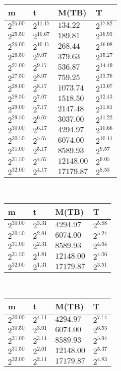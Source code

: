 \begin{tabular}{llll}
m & t & M(TB) & T \\ \hline
$2^{25.00}$ & $2^{11.17}$ & $134.22$ & $2^{17.82}$ \\
$2^{25.50}$ & $2^{10.67}$ & $189.81$ & $2^{16.93}$ \\
$2^{26.00}$ & $2^{10.17}$ & $268.44$ & $2^{16.08}$ \\
$2^{26.50}$ & $2^{9.67}$ & $379.63$ & $2^{15.27}$ \\
$2^{27.00}$ & $2^{9.17}$ & $536.87$ & $2^{14.49}$ \\
$2^{27.50}$ & $2^{8.67}$ & $759.25$ & $2^{13.76}$ \\
$2^{28.00}$ & $2^{8.17}$ & $1073.74$ & $2^{13.07}$ \\
$2^{28.50}$ & $2^{7.67}$ & $1518.50$ & $2^{12.43}$ \\
$2^{29.00}$ & $2^{7.17}$ & $2147.48$ & $2^{11.81}$ \\
$2^{29.50}$ & $2^{6.67}$ & $3037.00$ & $2^{11.22}$ \\
$2^{30.00}$ & $2^{6.17}$ & $4294.97$ & $2^{10.66}$ \\
$2^{30.50}$ & $2^{5.67}$ & $6074.00$ & $2^{10.11}$ \\
$2^{31.00}$ & $2^{5.17}$ & $8589.93$ & $2^{9.57}$ \\
$2^{31.50}$ & $2^{4.67}$ & $12148.00$ & $2^{9.05}$ \\
$2^{32.00}$ & $2^{4.17}$ & $17179.87$ & $2^{8.53}$ \\
\end{tabular}
 \ 
\begin{tabular}{llll}
m & t & M(TB) & T \\ \hline
$2^{30.00}$ & $2^{3.31}$ & $4294.97$ & $2^{5.88}$ \\
$2^{30.50}$ & $2^{2.81}$ & $6074.00$ & $2^{5.24}$ \\
$2^{31.00}$ & $2^{2.31}$ & $8589.93$ & $2^{4.64}$ \\
$2^{31.50}$ & $2^{1.81}$ & $12148.00$ & $2^{4.06}$ \\
$2^{32.00}$ & $2^{1.31}$ & $17179.87$ & $2^{3.51}$ \\
\end{tabular}
 \ 
\begin{tabular}{llll}
m & t & M(TB) & T \\ \hline
$2^{30.00}$ & $2^{4.11}$ & $4294.97$ & $2^{7.14}$ \\
$2^{30.50}$ & $2^{3.61}$ & $6074.00$ & $2^{6.53}$ \\
$2^{31.00}$ & $2^{3.11}$ & $8589.93$ & $2^{5.94}$ \\
$2^{31.50}$ & $2^{2.61}$ & $12148.00$ & $2^{5.37}$ \\
$2^{32.00}$ & $2^{2.11}$ & $17179.87$ & $2^{4.83}$ \\
\end{tabular}
